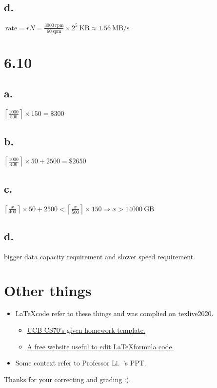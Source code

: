 \documentclass[11pt]{article}  %
\begin{document}
\subsection*{d. }

$ ~\text{rate} = rN = \frac{3000 ~\text{rpm} }{60 ~\text{spm}} \times 2^5~\text{KB}\approx 1.56~\text{MB/s}$


\section*{6.10 }

\subsection*{a. }

$\left \lceil \frac{1000}{500} \right \rceil\times 150 = \$300 $

\subsection*{b. }

$\left \lceil \frac{1000}{400} \right \rceil\times 50  + 2500 = \$2650 $

\subsection*{c. }

$\left \lceil \frac{x}{400} \right \rceil\times 50  + 2500 < \left \lceil \frac{x}{500} \right \rceil\times 150  
\Longrightarrow x > 14000~\text{GB}$

\subsection*{d. }

bigger data capacity requirement and slower speed requirement.

\section*{Other things}

\begin{itemize}
    \item \LaTeX \space code refer to these things and was complied on texlive2020. 
    \begin{itemize}
        \item  \href{https://www.eecs70.org/assets/misc/homework_template.tex}{UCB-CS70's given homework template.} 
        \item  \href{https://www.latexlive.com}{A free website useful to edit \LaTeX \space formula code.}
    \end{itemize}
    \item Some context refer to Professor Li.~'s PPT.
\end{itemize}

    Thanks for your correcting and grading :).
\end{document}
